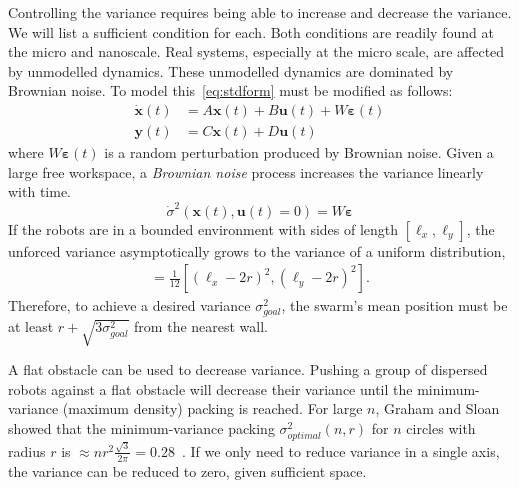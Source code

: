 Controlling the variance requires being able to increase and decrease the variance.  We will list a sufficient condition for each. Both conditions are readily found at the micro and nanoscale. 
Real systems, especially at the micro scale, are affected by unmodelled dynamics. These unmodelled dynamics are dominated by Brownian noise. To model this~\eqref{eq:stdform} must be modified as follows:
\begin{align}
\dot{\mathbf{x}}(t)  &=  A \mathbf{x}(t) + B \mathbf{u}(t) + W \bm{\varepsilon}(t)\\
 \mathbf{y}(t) &= C  \mathbf{x}(t) + D  \mathbf{u}(t)\nonumber
\end{align}
where $W\bm{\varepsilon}(t)$ is a random perturbation produced by Brownian noise. Given a large free workspace, a \emph{Brownian noise} process increases the variance linearly with time.
\begin{equation*}\dot{\sigma}^2(\mathbf{x}(t), \mathbf{u}(t) = 0)  = W \bm{\varepsilon} \end{equation*}
If the robots are in a bounded environment with sides of length $[\ell_x, \ell_y]$, the unforced variance asymptotically grows to the variance of a uniform distribution,
\begin{align}
[\sigma_x^2,\sigma_y^2] = \frac{1}{12}[ (\ell_x - 2 r)^2,(\ell_y - 2 r)^2].
\end{align}
 Therefore, to achieve a desired variance $\sigma^2_{goal}$, the swarm's mean position must be at least $r+\sqrt{3 \sigma^2_{goal}}$ from the nearest wall.

 A flat obstacle can be used to decrease variance. Pushing a group of dispersed robots against a flat obstacle will decrease their variance until the minimum-variance (maximum density) packing  is reached. For large $n$, Graham and Sloan showed that the minimum-variance packing  $\sigma^2_{optimal}(n,r)$ for $n$ circles with radius $r$ is $\approx 
  n r^2 \frac{\sqrt{3}}{2 \pi} = 0.28$~\cite{graham1990penny}. 
If we only need to reduce variance in a single axis, the variance can be reduced to zero, given sufficient space.

